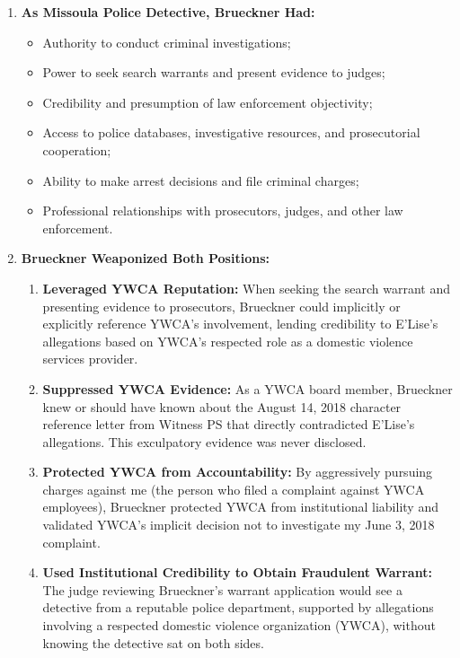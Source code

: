 \documentclass[12pt,letterpaper]{article}
\begin{document}
\begin{enumerate}
\item \textbf{As Missoula Police Detective, Brueckner Had:}

\begin{itemize}
\item Authority to conduct criminal investigations;
\item Power to seek search warrants and present evidence to judges;
\item Credibility and presumption of law enforcement objectivity;
\item Access to police databases, investigative resources, and prosecutorial cooperation;
\item Ability to make arrest decisions and file criminal charges;
\item Professional relationships with prosecutors, judges, and other law enforcement.
\end{itemize}

\item \textbf{Brueckner Weaponized Both Positions:}

\begin{enumerate}
\item \textbf{Leveraged YWCA Reputation:} When seeking the search warrant and presenting evidence to prosecutors, Brueckner could implicitly or explicitly reference YWCA's involvement, lending credibility to E'Lise's allegations based on YWCA's respected role as a domestic violence services provider.

\item \textbf{Suppressed YWCA Evidence:} As a YWCA board member, Brueckner knew or should have known about the August 14, 2018 character reference letter from Witness PS that directly contradicted E'Lise's allegations. This exculpatory evidence was never disclosed.

\item \textbf{Protected YWCA from Accountability:} By aggressively pursuing charges against me (the person who filed a complaint against YWCA employees), Brueckner protected YWCA from institutional liability and validated YWCA's implicit decision not to investigate my June 3, 2018 complaint.

\item \textbf{Used Institutional Credibility to Obtain Fraudulent Warrant:} The judge reviewing Brueckner's warrant application would see a detective from a reputable police department, supported by allegations involving a respected domestic violence organization (YWCA), without knowing the detective sat on both sides.


\end{enumerate}
\end{enumerate}
\end{document}
